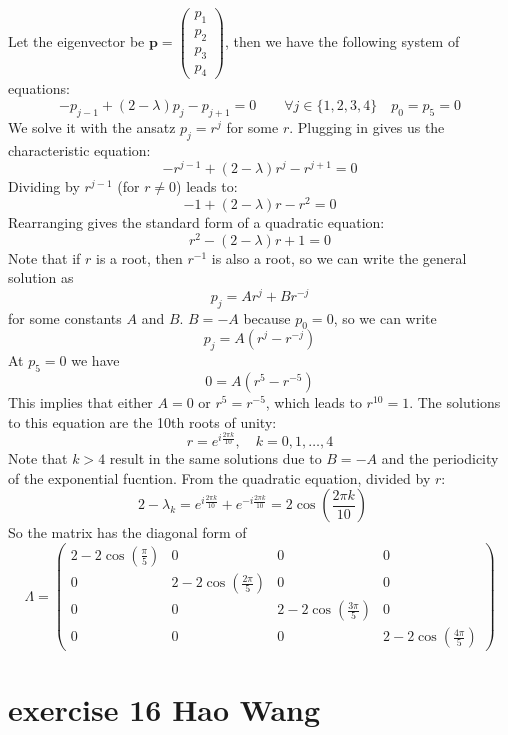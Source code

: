 \documentclass{article}
\begin{document}
Let the eigenvector be $\mathbf{p} = \begin{pmatrix} p_1 \\ p_2 \\ p_3 \\ p_4 \end{pmatrix}$, then we have the following system of equations:
\[ - {p_{j - 1}} + \left( {2 - \lambda } \right){p_j} - {p_{j + 1}} = 0\qquad \forall j \in \{ 1,2,3,4\} \quad {p_0} = {p_5} = 0\]
We solve it with the ansatz $p_j = r^j$ for some $r$. Plugging in gives us the characteristic equation:
\[ - r^{j-1} + (2 - \lambda) r^j - r^{j+1} = 0 \]
Dividing by $r^{j-1}$ (for $r \neq 0$) leads to:
\[ - 1 + (2 - \lambda) r - r^2 = 0 \]
Rearranging gives the standard form of a quadratic equation:
\[ r^2 - (2 - \lambda) r + 1 = 0 \]
Note that if $r$ is a root, then $r^{-1}$ is also a root, so we can write the general solution as
\[ p_j = A r^j + B r^{-j} \]
for some constants $A$ and $B$. $B=-A$ because $p_0 = 0$, so we can write
\[ p_j = A \left( r^j - r^{-j} \right) \]
At $p_5  =0$ we have
\[ 0 = A \left( r^5 - r^{-5} \right) \]
This implies that either $A = 0$ or $r^5 = r^{-5}$, which leads to $r^{10} = 1$. The solutions to this equation are the 10th roots of unity:
\[ r = e^{i\frac{2\pi k}{10}}, \quad k = 0, 1, \ldots, 4 \]
Note that $k>4$ result in the same solutions due to $B=-A$ and the periodicity of the exponential fucntion. From the quadratic equation, divided by $r$:
\[2-\lambda_k = e^{i\frac{2\pi k}{10}} + e^{-i\frac{2\pi k}{10}} = 2 \cos\left(\frac{2\pi k}{10}\right)\quad \]
So the matrix has the diagonal form of
\[
    \Lambda = \begin{pmatrix}
        2 - 2\cos\left(\frac{\pi}{5}\right) & 0                                    & 0                                    & 0                                    \\
        0                                   & 2 - 2\cos\left(\frac{2\pi}{5}\right) & 0                                    & 0                                    \\
        0                                   & 0                                    & 2 - 2\cos\left(\frac{3\pi}{5}\right) & 0                                    \\
        0                                   & 0                                    & 0                                    & 2 - 2\cos\left(\frac{4\pi}{5}\right)
    \end{pmatrix}
\]

\section{exercise 16 Hao Wang}
\end{document}
